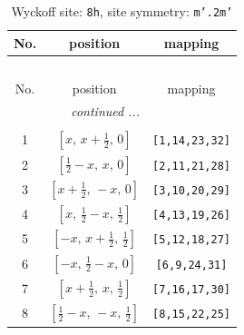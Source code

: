 \documentclass[fleqn,8pt]{jsarticle}
\begin{document}
\begin{longtable}{ccc}
\caption{Wyckoff site: {\tt 8h}, site symmetry: {\tt m'.2m'}}
 \\
 \hline \hline
No. & position & mapping \\ \hline \endfirsthead

\multicolumn{2}{l}{\tablename\ \thetable{}} \\
 \hline \hline
No. & position & mapping \\ \hline \endhead

 \hline \hline
\multicolumn{2}{r}{\footnotesize\it continued ...} \\ \endfoot

 \hline \hline
\multicolumn{2}{r}{} \\ \endlastfoot

1 & $\left[ x,\, x + \frac{1}{2},\, 0 \right]$ & {\tt [1,14,23,32]} \\ \hline
2 & $\left[ \frac{1}{2} - x,\, x,\, 0 \right]$ & {\tt [2,11,21,28]} \\ \hline
3 & $\left[ x + \frac{1}{2},\, - x,\, 0 \right]$ & {\tt [3,10,20,29]} \\ \hline
4 & $\left[ x,\, \frac{1}{2} - x,\, \frac{1}{2} \right]$ & {\tt [4,13,19,26]} \\ \hline
5 & $\left[ - x,\, x + \frac{1}{2},\, \frac{1}{2} \right]$ & {\tt [5,12,18,27]} \\ \hline
6 & $\left[ - x,\, \frac{1}{2} - x,\, 0 \right]$ & {\tt [6,9,24,31]} \\ \hline
7 & $\left[ x + \frac{1}{2},\, x,\, \frac{1}{2} \right]$ & {\tt [7,16,17,30]} \\ \hline
8 & $\left[ \frac{1}{2} - x,\, - x,\, \frac{1}{2} \right]$ & {\tt [8,15,22,25]} \\
\end{longtable}
\renewcommand{\arraystretch}{1.2}
\end{document}
